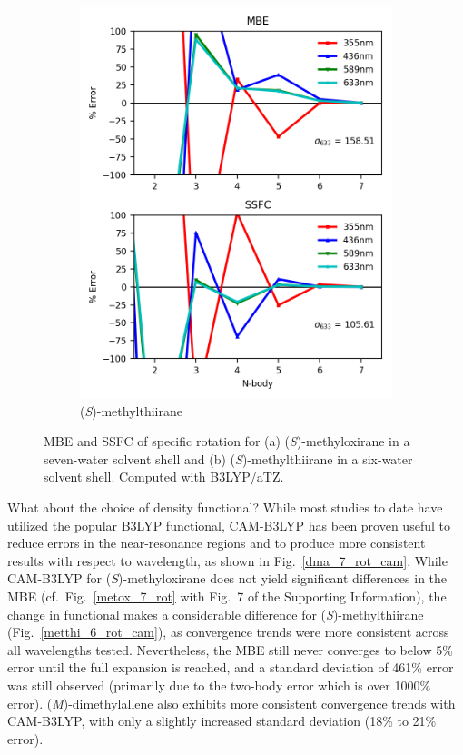 \begin{figure}
\begin{subfigure}{0.5\textwidth}
                \includegraphics[scale=0.75]{p1/graphs/metthi_6_tz_rot.png}
                \caption{(\textit{S})-methylthiirane}
                \label{metthi_6_rot_tz}
            \end{subfigure}
            \caption{MBE and SSFC of specific rotation for (a) (\textit{S})-methyloxirane in a seven-water solvent shell and (b) (\textit{S})-methylthiirane in a six-water solvent shell. Computed with B3LYP/aTZ.}
            \label{metox_metthi_rot_tz}
        \end{figure}

        What about the choice of density functional?  While most studies to date have utilized the popular B3LYP functional, CAM-B3LYP has been proven useful to reduce errors in the near-resonance regions\cite{Peach2008,Lipparini2013} and to produce more consistent results with respect to wavelength, as shown in Fig.~\ref{dma_7_rot_cam}. While CAM-B3LYP for  (\textit{S})-methyloxirane does not yield significant differences in the MBE (cf.\ Fig.~\ref{metox_7_rot} with Fig.~7 of the Supporting Information), the change in functional makes a considerable difference for (\textit{S})-methylthiirane (Fig.~\ref{metthi_6_rot_cam}), as convergence trends were more consistent across all wavelengths tested. Nevertheless, the MBE still never converges to below 5\% error until the full expansion is reached, and a standard deviation of 461\% error was still observed (primarily due to the two-body error which is over 1000\% error). (\textit{M})-dimethylallene also exhibits more consistent convergence trends with CAM-B3LYP, with only a slightly increased standard deviation (18\% to 21\% error).

